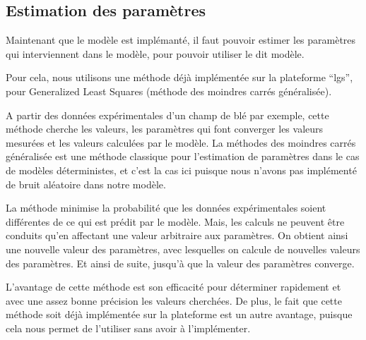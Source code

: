 \subsection{Estimation des paramètres}

Maintenant que le modèle est implémanté, il faut pouvoir estimer les paramètres qui interviennent dans le modèle, pour pouvoir utiliser le dit modèle.

Pour cela, nous utilisons une méthode déjà implémentée sur la plateforme ``lgs'', pour Generalized Least Squares (méthode des moindres carrés généralisée).

A partir des données expérimentales d'un champ de blé par exemple, cette méthode cherche les valeurs, les paramètres qui font converger les valeurs mesurées et les valeurs calculées par le modèle. 
La méthodes des moindres carrés généralisée est une méthode classique pour l'estimation de paramètres dans le cas de modèles déterministes, et c'est la cas ici puisque nous n'avons pas implémenté de bruit aléatoire dans notre modèle.

La méthode minimise la probabilité que les données expérimentales soient différentes de ce qui est prédit par le modèle. 
Mais, les calculs ne peuvent être conduits qu'en affectant une valeur arbitraire aux paramètres. On obtient ainsi une nouvelle valeur des paramètres, avec lesquelles on calcule de nouvelles valeurs des paramètres. Et ainsi de suite, jusqu'à que la valeur des paramètres converge.

L'avantage de cette méthode est son efficacité pour déterminer rapidement et avec une assez bonne précision les valeurs cherchées.
De plus, le fait que cette méthode soit déjà implémentée sur la plateforme est un autre avantage, puisque cela nous permet de l'utiliser sans avoir à l'implémenter. 

